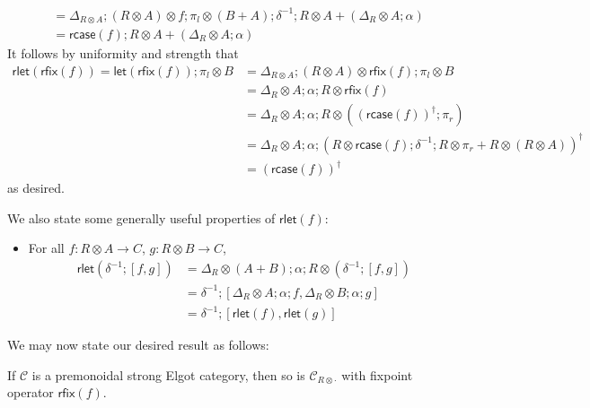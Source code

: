 \documentclass[acmsmall,screen,review]{acmart}
\newcommand{\mc}[1]{\ensuremath{\mathcal{#1}}}
\newcommand{\ms}[1]{\ensuremath{\mathsf{#1}}}
\newcommand{\dmor}[1]{{\Delta}_{#1}}
\newcommand{\lmor}[1]{\ms{let}(#1)}
\newcommand{\envcom}[2]{{#1}_{#2 \otimes \cdot}}
\newcommand{\rlmor}[1]{\ms{rlet}(#1)}
\newcommand{\rcase}[1]{\ms{rcase}(#1)}
\newcommand{\rfix}[1]{\ms{rfix}(#1)}
\begin{document}
\begin{itemize}
\begin{equation}
\begin{aligned}
      & = \dmor{R \otimes A}
        ; (R \otimes A) \otimes f
        ; \pi_l \otimes (B + A)
        ; \delta^{-1}
        ; R \otimes A + (\dmor{R} \otimes A ; \alpha) \\
      &= \rcase{f} ; R \otimes A + (\dmor{R} \otimes A ; \alpha)
    \end{aligned}
  \end{equation}
  It follows by uniformity and strength that
  \begin{equation}
    \begin{aligned}
    \rlmor{\rfix{f}} = \lmor{\rfix{f}} ; \pi_l \otimes B 
      &= \dmor{R \otimes A} ; (R \otimes A) \otimes \rfix{f} ; \pi_l \otimes B \\
      &= \dmor{R} \otimes A ; \alpha ; R \otimes \rfix{f} \\
      &= \dmor{R} \otimes A ; \alpha ; R \otimes ((\rcase{f})^\dagger ; \pi_r) \\
      &= \dmor{R} \otimes A ; \alpha
        ; (R \otimes \rcase{f} ; \delta^{-1} ; R \otimes \pi_r + R \otimes (R \otimes A))^\dagger \\
      &= (\rcase{f})^\dagger
    \end{aligned}
  \end{equation}
  as desired.
\end{itemize}
We also state some generally useful properties of $\rlmor{f}$:
\begin{itemize}
  \item For all $f : R \otimes A \to C$, $g : R \otimes B \to C$, 
  \begin{equation}
    \begin{aligned}
        \rlmor{\delta^{-1} ; [f, g]} 
        & = \dmor{R} \otimes (A + B) ; \alpha ; R \otimes (\delta^{-1} ; [f, g]) \\
        & = \delta^{-1} ; [\dmor{R} \otimes A ; \alpha ; f, \dmor{R} \otimes B ; \alpha ; g] \\
        & = \delta^{-1} ; [\rlmor{f}, \rlmor{g}]
    \end{aligned}
  \end{equation}
\end{itemize}
We may now state our desired result as follows:
\begin{lemma}
  If $\mc{C}$ is a premonoidal strong Elgot category, then so is $\envcom{\mc{C}}{R}$ with
  fixpoint operator $\rfix{f}$.
\end{lemma}
\end{document}

